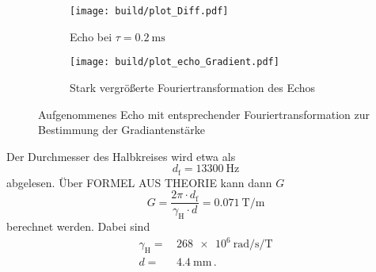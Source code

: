 \begin{figure}
    \centering
    \begin{subfigure}{0.4\textwidth}
        \centering
        \texttt{[image: build/plot\_Diff.pdf]}
        \caption{Echo bei $\tau = \SI{0.2}{\milli\second}$}
        \label{fig:echo}
    \end{subfigure}
    \begin{subfigure}{0.4\textwidth}
        \centering
        \texttt{[image: build/plot\_echo\_Gradient.pdf]}
        \caption{Stark vergrößerte Fouriertransformation des Echos}
        \label{fig:fourier}
    \end{subfigure}
    \caption{Aufgenommenes Echo mit entsprechender Fouriertransformation zur Bestimmung der Gradiantenstärke}
    \label{fig:g_messung}
\end{figure}

Der Durchmesser des Halbkreises wird etwa als 
\begin{equation}
    d_\text{f} = \SI{13300}{\hertz} 
    \label{eq:df}
\end{equation}
abgelesen.
Über FORMEL AUS THEORIE kann dann $G$ 
\begin{equation}
    G = \frac{2 \pi \cdot d_\text{f}}{\gamma _\text{H} \cdot d} = \SI{0.071}{\tesla\per\meter}
    \label{eq:g_wert}
\end{equation}
berechnet werden.
Dabei sind
\begin{align*}
    \gamma _\text{H} =& \, \SI{268e6}{\radian\per\second\per\tesla} \\
    d =& \, \SI{4.4}{\milli\meter} \, .
\end{align*}